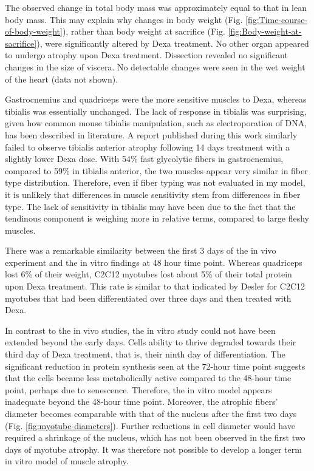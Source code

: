 \documentclass[12pt,english]{report}\usepackage[]{graphicx}\usepackage[]{color}
\begin{document}
The observed change in total body mass was approximately equal to
that in lean body mass. This may explain why changes in body weight
(Fig. \ref{fig:Time-course-of-body-weight}), rather than body weight
at sacrifice (Fig. \ref{fig:Body-weight-at-sacrifice}), were significantly
altered by Dexa treatment. No other organ appeared to undergo atrophy
upon Dexa treatment. Dissection revealed no significant changes in
the size of viscera. No detectable changes were seen in the wet weight
of the heart (data not shown).

Gastrocnemius and quadriceps were the more sensitive muscles to Dexa,
whereas tibialis was essentially unchanged. The lack of response in
tibialis was surprising, given how common mouse tibialis manipulation,
such as electroporation of DNA, has been described in literature.
A report published during this work similarly failed to observe tibialis
anterior atrophy following 14 days treatment with a slightly lower
Dexa dose\citep{baehr2011muscle}. With 54\% fast glycolytic fibers
in gastrocnemius, compared to 59\% in tibialis anterior\citep{augusto2004skeletal},
the two muscles appear very similar in fiber type distribution. Therefore,
even if fiber typing was not evaluated in my model, it is unlikely
that differences in muscle sensitivity stem from differences in fiber
type. The lack of sensitivity in tibialis may have been due to the
fact that the tendinous component is weighing more in relative terms,
compared to large fleshy muscles.

There was a remarkable similarity between the first 3 days of the
in vivo experiment and the in vitro findings at 48 hour time point.
Whereas quadriceps lost 6\% of their weight, C2C12 myotubes lost about
5\% of their total protein upon Dexa treatment. This rate is similar
to that indicated by Desler for C2C12 myotubes that had been differentiated
over three days and then treated with Dexa\citep{desler1996effects}.

In contrast to the in vivo studies, the in vitro study could not have
been extended beyond the early days. Cells ability to thrive degraded
towards their third day of Dexa treatment, that is, their ninth day
of differentiation. The significant reduction in protein synthesis
seen at the 72-hour time point suggests that the cells became less
metabolically active compared to the 48-hour time point, perhaps due
to senescence. Therefore, the in vitro model appears inadequate beyond
the 48-hour time point. Moreover, the atrophic fibers' diameter becomes
comparable with that of the nucleus after the first two days (Fig.
\ref{fig:myotube-diameters}). Further reductions in cell diameter
would have required a shrinkage of the nucleus, which has not been
observed in the first two days of myotube atrophy. It was therefore
not possible to develop a longer term in vitro model of muscle atrophy.
\end{document}
